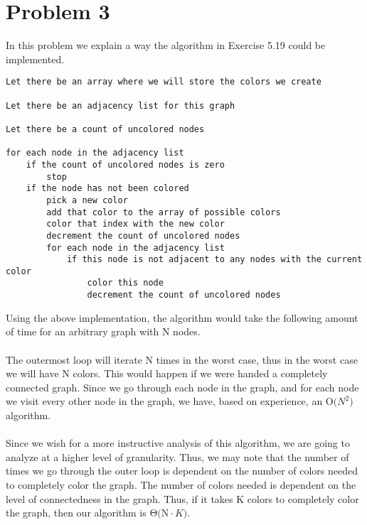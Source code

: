 \section*{Problem 3}

In this problem we explain a way the algorithm in Exercise 5.19 could be implemented.

\begin{lstlisting}
Let there be an array where we will store the colors we create

Let there be an adjacency list for this graph

Let there be a count of uncolored nodes

for each node in the adjacency list
    if the count of uncolored nodes is zero
        stop
    if the node has not been colored
        pick a new color
        add that color to the array of possible colors
        color that index with the new color
        decrement the count of uncolored nodes
        for each node in the adjacency list
            if this node is not adjacent to any nodes with the current color 
                color this node
                decrement the count of uncolored nodes
\end{lstlisting}

Using the above implementation, the algorithm would take the following amount of time for an arbitrary graph with N nodes.
\\
\\
The outermost loop will iterate N times in the worst case, thus in the worst case we will have N colors. This would happen if we were handed a completely connected graph. Since we go through each node in the graph, and for each node we visit every other node in the graph, we have, based on experience, an $\mathrm{O(}N^2\mathrm{)}$ algorithm. 
\\
\\
Since we wish for a more instructive analysis of this algorithm, we are going to analyze at a higher level of granularity. Thus, we may note that the number of times we go through the outer loop is dependent on the number of colors needed to completely color the graph. The number of colors needed is dependent on the level of connectedness in the graph. Thus, if it takes K colors to completely color the graph, then our algorithm is  $\mathrm{\Theta (N}\cdot K \mathrm{)}$. 
